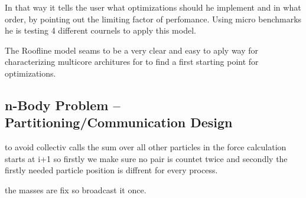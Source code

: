 \documentclass[a4paper,11pt]{scrartcl}
\begin{document}
In that way it tells the user what optimizations should he implement and in what order, by pointing out the limiting factor of perfomance.
Using micro benchmarks he is testing 4 different cournels to apply this model.

The Roofline model seams to be a very clear and easy to aply way for characterizing multicore architures for to find a first starting point for optimizations.
 \subsection{n-Body Problem – Partitioning/Communication Design}
to avoid collectiv calls the sum over all other particles in the force calculation starts at i+1 so firstly we make sure no pair is countet twice and secondly the firstly needed particle position is diffrent for every process.

the masses are fix so broadcast it once.
\end{document}
